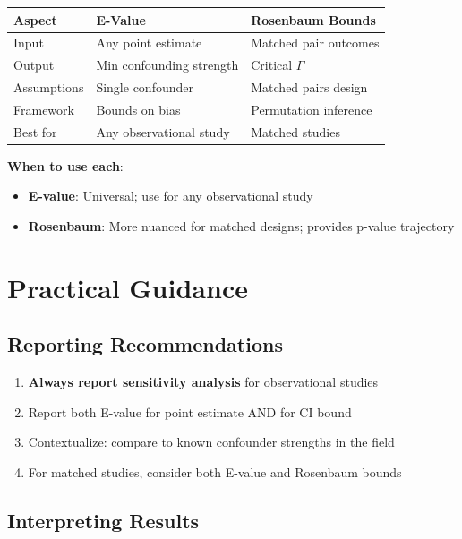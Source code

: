 \begin{center}
\begin{tabular}{lp{4.5cm}p{4.5cm}}
\toprule
Aspect & E-Value & Rosenbaum Bounds \\
\midrule
Input & Any point estimate & Matched pair outcomes \\
Output & Min confounding strength & Critical $\Gamma$ \\
Assumptions & Single confounder & Matched pairs design \\
Framework & Bounds on bias & Permutation inference \\
Best for & Any observational study & Matched studies \\
\bottomrule
\end{tabular}
\end{center}

\textbf{When to use each}:
\begin{itemize}
    \item \textbf{E-value}: Universal; use for any observational study
    \item \textbf{Rosenbaum}: More nuanced for matched designs; provides p-value trajectory
\end{itemize}

\section{Practical Guidance}
\label{sec:sens_guidance}

\subsection{Reporting Recommendations}

\begin{enumerate}
    \item \textbf{Always report sensitivity analysis} for observational studies
    \item Report both E-value for point estimate AND for CI bound
    \item Contextualize: compare to known confounder strengths in the field
    \item For matched studies, consider both E-value and Rosenbaum bounds
\end{enumerate}

\subsection{Interpreting Results}

